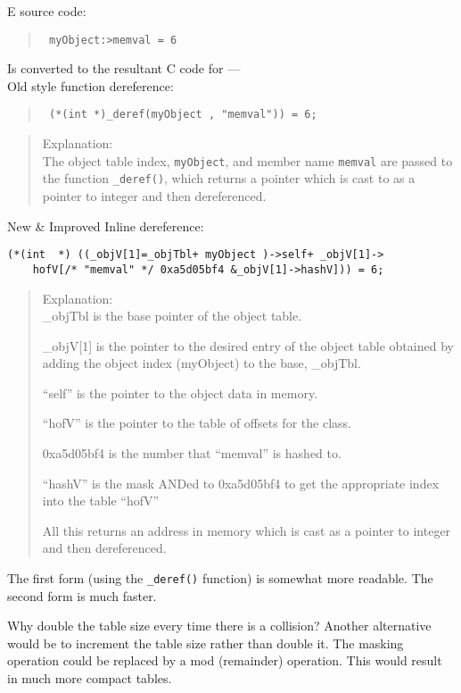 E source code:
\begin{quote} \tt
myObject:>memval = 6
\end{quote}
Is converted to the resultant C code for ---\\
Old style function dereference:
\begin{quote} \tt
(*(int  *)\_deref(myObject , "memval")) = 6; 
\end{quote}
\begin{quote}
	Explanation:\\
	The object table index, {\tt myObject}, and member name {\tt memval} are
	passed to the function {\tt \_deref()}, which returns a pointer 
	which is cast to as a pointer to integer and then dereferenced.
\end{quote}
New \& Improved Inline dereference:
\begin{verbatim}
(*(int  *) ((_objV[1]=_objTbl+ myObject )->self+ _objV[1]->
    hofV[/* "memval" */ 0xa5d05bf4 &_objV[1]->hashV])) = 6;
\end{verbatim}
\begin{quotation}

	Explanation:\\
	\_objTbl is the base pointer of the object table.

	\_objV[1] is the pointer to the desired entry of the object
	table obtained by adding the object index (myObject) to the
	base, \_objTbl.

	``self'' is the pointer to the object data in memory.

	``hofV'' is the pointer to the table of offsets for the class.

	0xa5d05bf4 is the number that ``memval'' is hashed to.

	``hashV'' is the mask ANDed to 0xa5d05bf4 to get the appropriate index
	into the table ``hofV''

	All this returns an address in memory which is cast as a pointer to
	integer and then dereferenced.
\end{quotation}

The first form (using the {\tt \_deref()} function) is somewhat more readable.
The second form is much faster.

Why double the table size every time there is a collision?
Another alternative would be to increment the table size rather than
double it.  The masking operation could be replaced by a mod (remainder)
operation.  This would result in much more compact tables.

